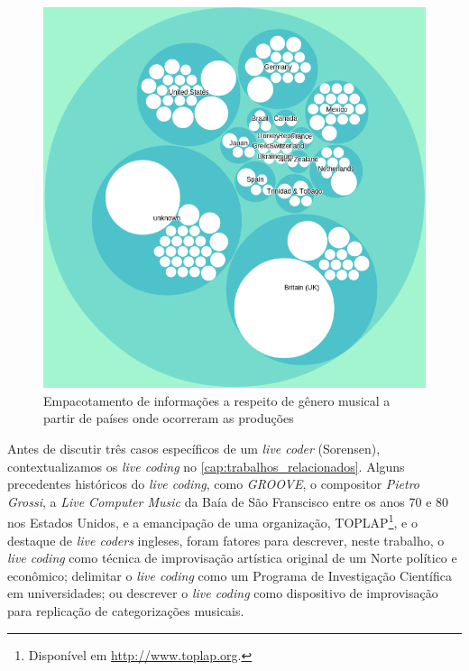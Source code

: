 \begin{figure}
\begin{center}
\includegraphics[scale=0.6]{./imagens/zoomable_circle_packing_genre_year_livecoding3.png}
\caption{Empacotamento de informações a respeito de gênero musical a partir de países onde ocorreram as produções}
\label{fig:pacotao3}
\end{center}
\end{figure}

Antes de discutir três casos específicos de um \emph{live coder} (Sorensen), contextualizamos os \emph{live coding} no \autoref{cap:trabalhos_relacionados}. Alguns precedentes históricos do \emph{live coding}, como \emph{GROOVE}, o compositor \emph{Pietro Grossi}, a \emph{Live Computer Music} da Baía de São Franscisco entre os anos 70 e 80 nos Estados Unidos, e a emancipação de uma organização, TOPLAP\footnote{Disponível em \url{http://www.toplap.org}.}, e o destaque de \emph{live coders} ingleses, foram fatores para descrever, neste trabalho, o \emph{live coding} como técnica de improvisação artística original de um Norte político e econômico; delimitar o \emph{live coding} como um Programa de Investigação Científica em universidades; ou descrever o \emph{live coding} como dispositivo de improvisação para replicação de categorizações musicais.

